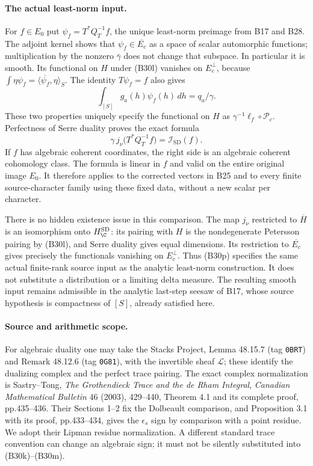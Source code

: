 \paragraph{The actual least-norm input.}
For $f\in E_0$ put $\psi_f=T^*Q_T^{-1}f$, the unique least-norm
preimage from B17 and B28.  The adjoint kernel shows that
$\psi_f\in\overline{E_c}$ as a space of scalar automorphic
functions; multiplication by the nonzero $\bar\gamma$ does not
change that subspace.  In particular it is smooth.  Its functional
on $H$ under (B30l) vanishes on $E_c^\perp$, because
$\int\eta\psi_f=\langle\overline{\psi_f},\eta\rangle_S$.
The identity $T\psi_f=f$ also gives
\[
                  \int_{[S]} g_a(h)\psi_f(h)\,dh=q_a/\gamma.
 \tag{B30o}
\]
These two properties uniquely specify the functional on $H$ as
$\gamma^{-1}\ell_f\circ\mathcal P_c$.  Perfectness of Serre
duality proves the exact formula
\[
 \boxed{\displaystyle
       \gamma\,j_\nu\bigl(T^*Q_T^{-1}f\bigr)
                          =\mathcal I_{\mathrm{SD}}(f).}
 \tag{B30p}
\]
If $f$ has algebraic coherent coordinates, the right side is an
algebraic coherent cohomology class.  The formula is linear in $f$
and valid on the entire original image $E_0$.  It therefore applies
to the corrected vectors in B25 and to every finite source-character
family using these fixed data, without a new scalar per character.

There is no hidden existence issue in this comparison.  The map
$j_\nu$ restricted to $\overline H$ is an isomorphism onto
$H^{\mathrm{SD}}_\C$: its pairing with $H$ is the nondegenerate
Petersson pairing by (B30l), and Serre duality gives equal dimensions.
Its restriction to $\overline{E_c}$ gives precisely the functionals
vanishing on $E_c^\perp$.  Thus (B30p) specifies the same actual
finite-rank source input as the analytic least-norm construction.
It does not substitute a distribution or a limiting delta measure.
The resulting smooth input remains admissible in the analytic
last-step seesaw of B17, whose source hypothesis is compactness of
$[S]$, already satisfied here.

\paragraph{Source and arithmetic scope.}
For algebraic duality one may take the Stacks Project,
Lemma 48.15.7 (tag \texttt{0BRT}) and Remark 48.12.6
(tag \texttt{0G81}), with the invertible sheaf $\mathscr L$;
these identify the dualizing complex and the perfect trace pairing.
The exact complex normalization is Sastry--Tong,
\emph{The Grothendieck Trace and the de Rham Integral},
\emph{Canadian Mathematical Bulletin} 46 (2003), 429--440,
Theorem 4.1 and its complete proof, pp.435--436.
Their Sections 1--2 fix the Dolbeault comparison, and
Proposition 3.1 with its proof, pp.433--434, gives the
$\epsilon_s$ sign by comparison with a point residue.
We adopt their Lipman residue normalization.  A different
standard trace convention can change an algebraic sign; it
must not be silently substituted into (B30k)--(B30m).

